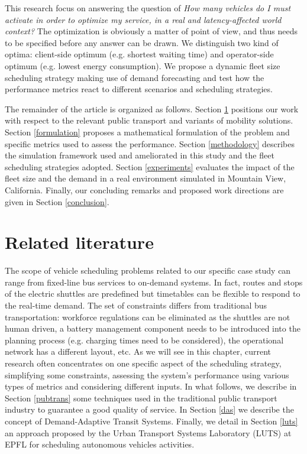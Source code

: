 \documentclass[12pt,a4paper]{article}
\begin{document}
This research focus on answering the question of \textit{How many vehicles do I must activate in order to optimize my service, in a real and latency-affected world context?} The optimization is obviously a matter of point of view, and thus needs to be specified before any answer can be drawn. We distinguish two kind of optima: client-side optimum (e.g.  shortest waiting time) and operator-side optimum (e.g. lowest energy consumption). We propose a dynamic fleet size scheduling strategy making use of demand forecasting and test how the performance metrics react to different scenarios and scheduling strategies. 

The remainder of the article is organized as follows. Section \ref{literature} positions our work with respect to the relevant public transport and variants of mobility solutions. Section \ref{formulation} proposes a mathematical formulation of the problem and specific metrics used to assess the performance. Section \ref{methodology} describes the simulation framework used and ameliorated in this study and the fleet scheduling strategies adopted. Section \ref{experiments} evaluates the impact of the fleet size and the demand in a real environment simulated in Mountain View, California. Finally, our concluding remarks and proposed work directions are given in Section \ref{conclusion}.  


\section{Related literature}\label{literature} 
The scope of vehicle scheduling problems related to our specific case study can range from fixed-line bus services to on-demand systems. In fact, routes and stops of the electric shuttles are predefined but timetables can be flexible to respond to the real-time demand. The set of constraints differs from traditional bus transportation: workforce regulations can be eliminated as the shuttles are not human driven, a battery management component needs to be introduced into the planning process (e.g. charging times need to be considered), the operational network has a different layout, etc. As we will see in this chapter, current research often concentrates on one specific aspect of the scheduling strategy, simplifying some constraints, assessing the system's performance using various types of metrics and considering different inputs. In what follows, we describe in Section \ref{pubtrans} some techniques used in the traditional public transport industry to guarantee a good quality of service. In Section \ref{das} we describe the concept of Demand-Adaptive Transit Systems. Finally, we detail in Section \ref{luts} an approach proposed by the Urban Transport Systems Laboratory (LUTS) at EPFL for scheduling autonomous vehicles activities.  
\end{document}
